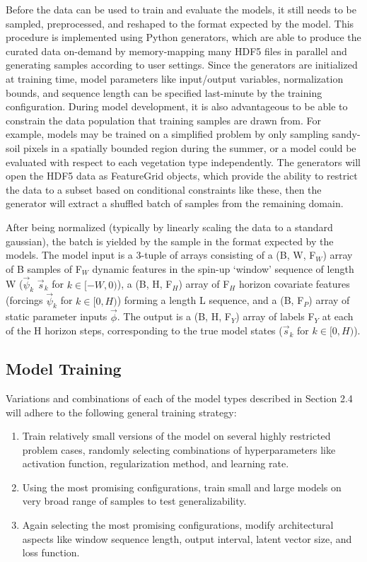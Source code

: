 \documentclass[11pt]{article}
\begin{document}
\begin{multicols}{2}
    Before the data can be used to train and evaluate the models, it still needs to be sampled, preprocessed, and reshaped to the format expected by the model. This procedure is implemented using Python generators, which are able to produce the curated data on-demand by memory-mapping many HDF5 files in parallel and generating samples according to user settings. Since the generators are initialized at training time, model parameters like input/output variables, normalization bounds, and sequence length can be specified last-minute by the training configuration. During model development, it is also advantageous to be able to constrain the data population that training samples are drawn from. For example, models may be trained on a simplified problem by only sampling sandy-soil pixels in a spatially bounded region during the summer, or a model could be evaluated with respect to each vegetation type independently. The generators will open the HDF5 data as FeatureGrid objects, which provide the ability to restrict the data to a subset based on conditional constraints like these, then the generator will extract a shuffled batch of samples from the remaining domain.

    After being normalized (typically by linearly scaling the data to a standard gaussian), the batch is yielded by the sample in the format expected by the models. The model input is a 3-tuple of arrays consisting of a (B, W, F$_W$) array of B samples of F$_W$ dynamic features in the spin-up `window' sequence of length W ($\vec{\psi}_k$ $\vec{s}_k$ for $k \in [-W,0)$), a (B, H, F$_H$) array of F$_H$ horizon covariate features (forcings $\vec{\psi}_k$ for $k \in [0,H)$) forming a length L sequence, and a (B, F$_P$) array of static parameter inputs $\vec{\phi}$. The output is a (B, H, F$_Y$) array of labels F$_Y$ at each of the H horizon steps, corresponding to the true model states ($\vec{s}_k$ for $k \in [0,H)$).

    \subsection{Model Training}

    Variations and combinations of each of the model types described in Section 2.4 will adhere to the following general training strategy:

    \begin{enumerate}
        \item Train relatively small versions of the model on several highly restricted problem cases, randomly selecting combinations of hyperparameters like activation function, regularization method, and learning rate.
        \item Using the most promising configurations, train small and large models on very broad range of samples to test generalizability.
        \item Again selecting the most promising configurations, modify architectural aspects like window sequence length, output interval, latent vector size, and loss function.
    \end{enumerate}


\end{multicols}
\end{document}
